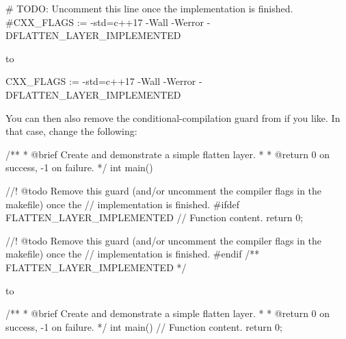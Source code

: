 \begin{makecode}
# TODO: Uncomment this line once the implementation is finished.
#CXX_FLAGS := -std=c++17 -Wall -Werror -DFLATTEN_LAYER_IMPLEMENTED
\end{makecode}

\noindent to

\begin{makecode}
CXX_FLAGS := -std=c++17 -Wall -Werror -DFLATTEN_LAYER_IMPLEMENTED
\end{makecode}

\noindent You can then also remove the conditional-compilation guard
 from  if you like. In that case, change the
following:

\begin{cppcode}
/**
 * @brief Create and demonstrate a simple flatten layer.
 *
 * @return 0 on success, -1 on failure.
 */
int main()
{
//! @todo Remove this guard (and/or uncomment the compiler flags in the makefile) once the
//        implementation is finished.
#ifdef FLATTEN_LAYER_IMPLEMENTED
    // Function content.
    return 0;

//! @todo Remove this guard (and/or uncomment the compiler flags in the makefile) once the
//        implementation is finished.
#endif /** FLATTEN_LAYER_IMPLEMENTED */
}
\end{cppcode}

\noindent to

\begin{cppcode}
/**
 * @brief Create and demonstrate a simple flatten layer.
 *
 * @return 0 on success, -1 on failure.
 */
int main()
{
    // Function content.
    return 0;
}
\end{cppcode}
